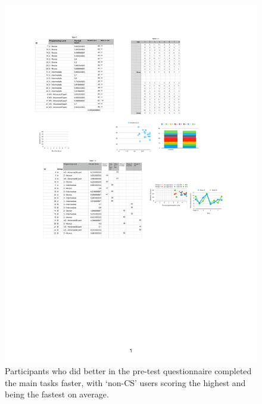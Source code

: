 \begin{figure}[h]%
	\centering
	\includegraphics[width=0.6\columnwidth]{figures/quan-pretest-results.pdf}%
	\caption{Participants who did better in the pre-test questionnaire completed the main tasks faster, with `non-CS' users scoring the highest and being the fastest on average.}\label{fig:pretestvstask}%
\end{figure}%



